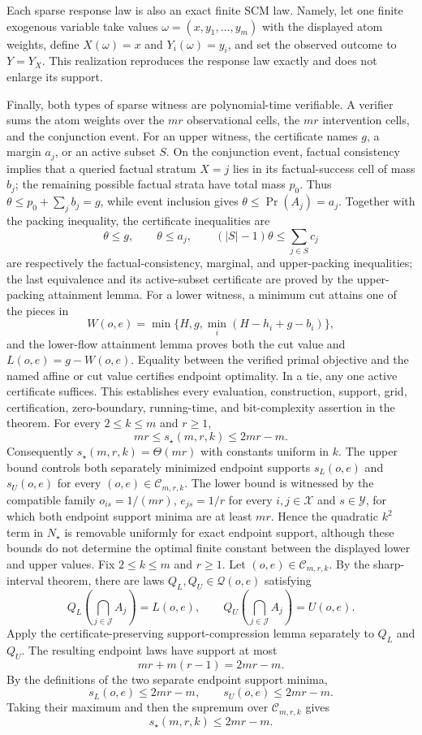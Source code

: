 Each sparse response law is also an exact finite SCM law.  Namely, let one finite exogenous variable take values \(\omega=(x,y_1,\ldots,y_m)\) with the displayed atom weights, define \(X(\omega)=x\) and \(Y_i(\omega)=y_i\), and set the observed outcome to \(Y=Y_X\).  This realization reproduces the response law exactly and does not enlarge its support.

Finally, both types of sparse witness are polynomial-time verifiable.  A verifier sums the atom weights over the \(mr\) observational cells, the \(mr\) intervention cells, and the conjunction event.  For an upper witness, the certificate names \(g\), a margin \(a_j\), or an active subset \(S\).  On the conjunction event, factual consistency implies that a queried factual stratum \(X=j\) lies in its factual-success cell of mass \(b_j\); the remaining possible factual strata have total mass \(p_0\).  Thus \(\theta\leq p_0+\sum_jb_j=g\), while event inclusion gives \(\theta\leq\Pr(A_j)=a_j\).  Together with the packing inequality, the certificate inequalities are
\[
\theta\leq g,
\qquad
\theta\leq a_j,
\qquad
(|S|-1)\theta\leq\sum_{j\in S}c_j
\]
are respectively the factual-consistency, marginal, and upper-packing inequalities; the last equivalence and its active-subset certificate are proved by the upper-packing attainment lemma.  For a lower witness, a minimum cut attains one of the pieces in
\[
W(o,e)=\min\{H,g,\min_i(H-h_i+g-b_i)\},
\]
and the lower-flow attainment lemma proves both the cut value and \(L(o,e)=g-W(o,e)\).  Equality between the verified primal objective and the named affine or cut value certifies endpoint optimality.  In a tie, any one active certificate suffices.  This establishes every evaluation, construction, support, grid, certification, zero-boundary, running-time, and bit-complexity assertion in the theorem.
For every \(2\leq k\leq m\) and \(r\geq1\),
\[
mr\leq s_\star(m,r,k)\leq2mr-m.
\]
Consequently \(s_\star(m,r,k)=\Theta(mr)\) with constants uniform in \(k\).  The upper bound controls both separately minimized endpoint supports \(s_L(o,e)\) and \(s_U(o,e)\) for every \((o,e)\in\mathcal C_{m,r,k}\).  The lower bound is witnessed by the compatible family \(o_{is}=1/(mr)\), \(e_{js}=1/r\) for every \(i,j\in\mathcal X\) and \(s\in\mathcal Y\), for which both endpoint support minima are at least \(mr\).  Hence the quadratic \(k^2\) term in \(N_\star\) is removable uniformly for exact endpoint support, although these bounds do not determine the optimal finite constant between the displayed lower and upper values.
Fix \(2\leq k\leq m\) and \(r\geq1\).  Let \((o,e)\in\mathcal C_{m,r,k}\).  By the sharp-interval theorem, there are laws \(Q_L,Q_U\in\mathcal Q(o,e)\) satisfying
\[
Q_L\!\left(\bigcap_{j\in\mathcal J}A_j\right)=L(o,e),
\qquad
Q_U\!\left(\bigcap_{j\in\mathcal J}A_j\right)=U(o,e).
\]
Apply the certificate-preserving support-compression lemma separately to \(Q_L\) and \(Q_U\).  The resulting endpoint laws have support at most
\[
mr+m(r-1)=2mr-m.
\]
By the definitions of the two separate endpoint support minima,
\[
s_L(o,e)\leq2mr-m,
\qquad
s_U(o,e)\leq2mr-m.
\]
Taking their maximum and then the supremum over \(\mathcal C_{m,r,k}\) gives
\[
s_\star(m,r,k)\leq2mr-m.
\]

